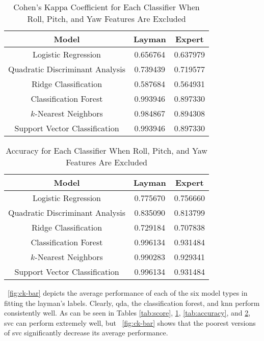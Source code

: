 \documentclass[../main.tex]{subfiles}
\begin{document}
\begin{table}
\caption{Cohen's Kappa Coefficient for Each Classifier When Roll, Pitch, and Yaw Features Are Excluded}
\centering
\label{tab:score-restricted}
\begin{tabular}{|c|c|c|}
\hline
\textbf{Model}                  & \textbf{Layman} & \textbf{Expert} \\
\hline
Logistic Regression             & 0.656764        & 0.637979        \\
Quadratic Discriminant Analysis & 0.739439        & 0.719577        \\
Ridge Classification            & 0.587684        & 0.564931        \\
Classification Forest           & 0.993946        & 0.897330        \\
$k$-Nearest Neighbors           & 0.984867        & 0.894308        \\
Support Vector Classification   & 0.993946        & 0.897330        \\
\hline
\end{tabular}
\end{table}

\begin{table}
\caption{Accuracy for Each Classifier When Roll, Pitch, and Yaw Features Are Excluded}
\centering
\label{tab:accuracy-restricted}
\begin{tabular}{|c|c|c|}
\hline
\textbf{Model}                  & \textbf{Layman} & \textbf{Expert} \\
\hline
Logistic Regression             & 0.775670        & 0.756660        \\
Quadratic Discriminant Analysis & 0.835090        & 0.813799        \\
Ridge Classification            & 0.729184        & 0.707838        \\
Classification Forest           & 0.996134        & 0.931484        \\
$k$-Nearest Neighbors           & 0.990283        & 0.929341        \\
Support Vector Classification   & 0.996134        & 0.931484        \\
\hline
\end{tabular}
\end{table}


\figurename \ \ref{fig:ck-bar} depicts the average performance of each of the six model types in fitting the layman's labels. Clearly, \ac{qda}, the classification forest, and \ac{knn} perform consistently well. As can be seen in Tables \ref{tab:score}, \ref{tab:score-restricted}, \ref{tab:accuracy}, and \ref{tab:accuracy-restricted}, \ac{svc} can perform extremely well, but \figurename \ \ref{fig:ck-bar} shows that the poorest versions of \ac{svc} significantly decrease its average performance.
\end{document}
